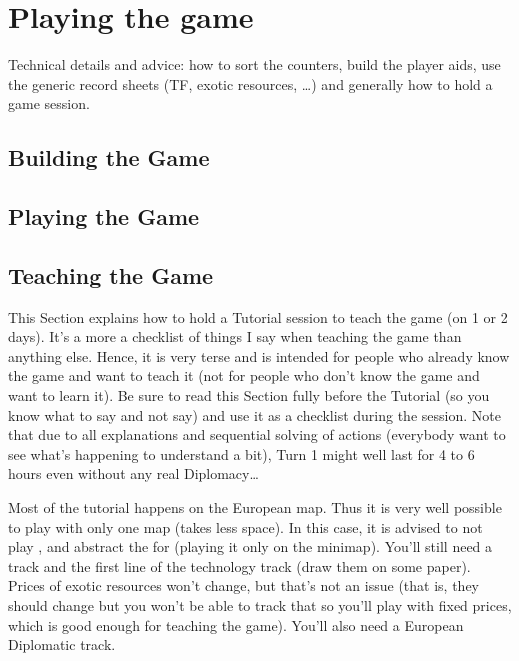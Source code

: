
\chapter{Playing the game}\label{chapter:Playing}

\begin{todo}
  Technical details and advice: how to sort the counters, build the player
  aids, use the generic record sheets (TF, exotic resources, \ldots) and
  generally how to hold a game session.
\end{todo}

\section{Building the Game}

\section{Playing the Game}

\section{Teaching the Game}
This Section explains how to hold a Tutorial session to teach the game (on 1
or 2 days). It's a more a checklist of things I say when teaching the game
than anything else. Hence, it is very terse and is intended for people who
already know the game and want to teach it (not for people who don't know the
game and want to learn it). Be sure to read this Section fully before the
Tutorial (so you know what to say and not say) and use it as a checklist
during the session. Note that due to all explanations and sequential solving
of actions (everybody want to see what's happening to understand a bit), Turn
1 might well last for 4 to 6 hours even without any real Diplomacy\ldots

Most of the tutorial happens on the European map. Thus it is very well
possible to play with only one map (takes less space). In this case, it is
advised to not play \POR, and abstract the \ROTW for \HIS (playing it only on
the minimap). You'll still need a \STAB track and the first line of the
technology track (draw them on some paper). Prices of exotic resources won't
change, but that's not an issue (that is, they should change but you won't be
able to track that so you'll play with fixed prices, which is good enough for
teaching the game). You'll also need a European Diplomatic track.

